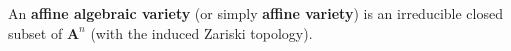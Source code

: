 An \textbf{affine algebraic variety} (or simply \textbf{affine variety}) is an irreducible closed subset of $\mathbf{A}^n$ (with the induced Zariski topology).
